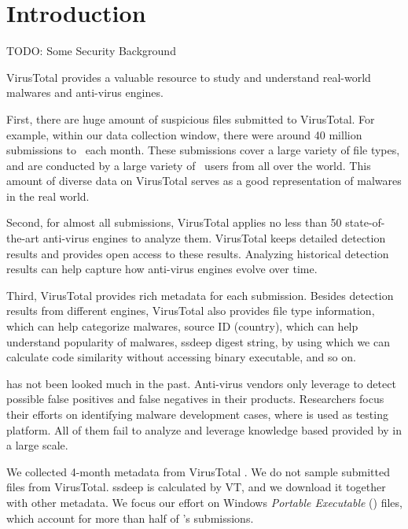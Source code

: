 \section{Introduction}
\label{sec:intro}



{\color{red} TODO: Some Security Background}



VirusTotal provides a valuable resource to study and 
understand real-world malwares and anti-virus engines. 

First, there are huge amount of suspicious files submitted to VirusTotal. 
For example, within our data collection window, 
there were around 40 million submissions to \vt\ each month. 
These submissions cover a large variety of file types, and 
are conducted by a large variety of \vt\ users from all over the world. 
This amount of diverse data on VirusTotal serves as a good representation of malwares in the real world.  

Second, for almost all submissions, 
VirusTotal applies no less than 50 state-of-the-art anti-virus engines to analyze them. 
VirusTotal keeps detailed detection results and provides open access to these results. 
Analyzing historical detection results can help capture how anti-virus engines evolve over time. 

Third, VirusTotal provides rich metadata for each submission. 
Besides detection results from different engines, 
VirusTotal also provides file type information, which can help categorize malwares, 
source ID (country), which can help understand popularity of malwares, 
ssdeep digest string, by using which we can calculate code similarity without accessing binary executable, and so on. 

{\color{red} \vt has not been looked much in the past. 
Anti-virus vendors only leverage \vt to detect possible false positives and false negatives in their products. 
Researchers focus their efforts on identifying malware development cases, 
where \vt is used as testing platform. 
All of them fail to analyze and leverage knowledge based provided by \vt in a large scale. }


We collected 4-month metadata from VirusTotal .
{\color{red} We do not sample submitted files from VirusTotal. ssdeep is calculated by VT, and we download it together with other metadata.}
We focus our effort on Windows \textit{Portable Executable} ({\em \pe}) files, 
which account for more than half of \vt{}’s submissions.

